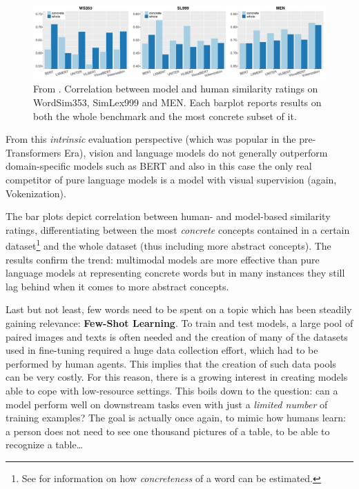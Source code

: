 \documentclass[
]{krantz}
\begin{document}
\begin{figure}

{\centering \includegraphics[width=1\linewidth]{figures/02-03-img-support-text/img-pezzele2021-02} 

}

\caption{From \citet{pezzelle2021word}. Correlation between model and human similarity ratings on WordSim353, SimLex999 and MEN. Each barplot reports results on both the whole benchmark and the most concrete subset of it.}\label{fig:img-pezzele2021-02}
\end{figure}



From this \emph{intrinsic} evaluation perspective (which was popular in the pre-Transformers Era), vision and language models do not generally outperform domain-specific models such as BERT and also in this case the only real competitor of pure language models is a model with visual supervision (again, Vokenization).

The bar plots depict correlation between human- and model-based similarity ratings, differentiating between the most \emph{concrete} concepts contained in a certain dataset\footnote{See \citet{brysbaert2014concreteness} for information on how \emph{concreteness} of a word can be estimated.} and the whole dataset (thus including more abstract concepts). The results confirm the trend: multimodal models are more effective than pure language models at representing concrete words but in many instances they still lag behind when it comes to more abstract concepts.

Last but not least, few words need to be spent on a topic which has been steadily gaining relevance: \textbf{Few-Shot Learning}. To train and test models, a large pool of paired images and texts is often needed and the creation of many of the datasets used in fine-tuning required a huge data collection effort, which had to be performed by human agents. This implies that the creation of such data pools can be very costly. For this reason, there is a growing interest in creating models able to cope with low-resource settings. This boils down to the question: can a model perform well on downstream tasks even with just a \emph{limited number} of training examples? The goal is actually once again, to mimic how humans learn: a person does not need to see one thousand pictures of a table, to be able to recognize a table\ldots{}
\end{document}

